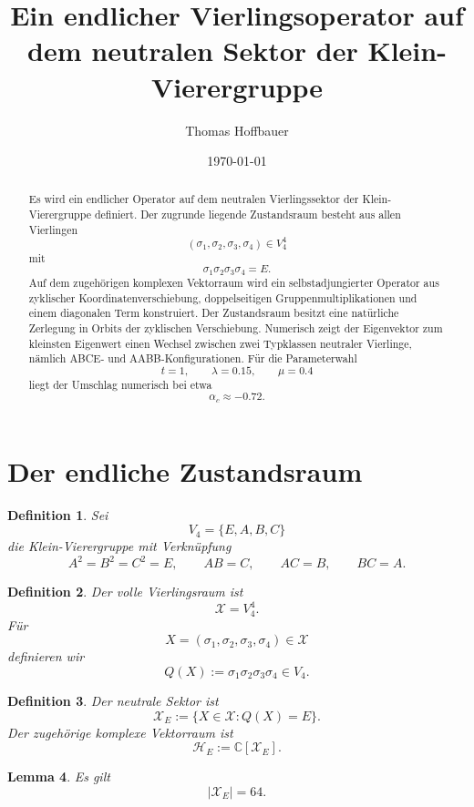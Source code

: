 \documentclass[11pt,a4paper]{article}
\title{Ein endlicher Vierlingsoperator auf dem neutralen Sektor der Klein-Vierergruppe}
\author{Thomas Hoffbauer}
\date{\today}
\newtheorem{definition}{Definition}[section]
\newtheorem{lemma}[definition]{Lemma}
\theoremstyle{remark}
\newcommand{\V}{V_4}
\newcommand{\X}{\mathcal X}
\newcommand{\XE}{\mathcal X_E}
\newcommand{\HE}{\mathcal H_E}
\begin{document}
	\maketitle
	
	\begin{abstract}
		Es wird ein endlicher Operator auf dem neutralen Vierlingssektor der Klein-Vierergruppe definiert. Der zugrunde liegende Zustandsraum besteht aus allen Vierlingen
		\[
		(\sigma_1,\sigma_2,\sigma_3,\sigma_4)\in \V^4
		\]
		mit
		\[
		\sigma_1\sigma_2\sigma_3\sigma_4=E.
		\]
		Auf dem zugehörigen komplexen Vektorraum wird ein selbstadjungierter Operator aus zyklischer Koordinatenverschiebung, doppelseitigen Gruppenmultiplikationen und einem diagonalen Term konstruiert. Der Zustandsraum besitzt eine natürliche Zerlegung in Orbits der zyklischen Verschiebung. Numerisch zeigt der Eigenvektor zum kleinsten Eigenwert einen Wechsel zwischen zwei Typklassen neutraler Vierlinge, nämlich ABCE- und AABB-Konfigurationen. Für die Parameterwahl
		\[
		t=1,\qquad \lambda=0.15,\qquad \mu=0.4
		\]
		liegt der Umschlag numerisch bei etwa
		\[
		\alpha_c\approx -0.72.
		\]
	\end{abstract}
	
	\section{Der endliche Zustandsraum}
	
	\begin{definition}
		Sei
		\[
		\V=\{E,A,B,C\}
		\]
		die Klein-Vierergruppe mit Verknüpfung
		\[
		A^2=B^2=C^2=E,\qquad AB=C,\qquad AC=B,\qquad BC=A.
		\]
	\end{definition}
	
	\begin{definition}
		Der volle Vierlingsraum ist
		\[
		\X=\V^4.
		\]
		Für
		\[
		X=(\sigma_1,\sigma_2,\sigma_3,\sigma_4)\in\X
		\]
		definieren wir
		\[
		Q(X):=\sigma_1\sigma_2\sigma_3\sigma_4\in\V.
		\]
	\end{definition}
	
	\begin{definition}
		Der neutrale Sektor ist
		\[
		\XE:=\{X\in\X:Q(X)=E\}.
		\]
		Der zugehörige komplexe Vektorraum ist
		\[
		\HE:=\mathbb C[\XE].
		\]
	\end{definition}
	
	\begin{lemma}
		Es gilt
		\[
		|\XE|=64.
		\]
	\end{lemma}
	
\end{document}
